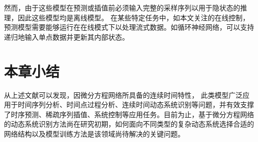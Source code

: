 然而，由于这些模型在预测或插值前必须输入完整的采样序列以用于隐状态的推理，因此这些模型均是离线模型\cite{Liu2020}。
在某些特定任务中，如本文关注的在线控制，预测模型需要能够运行在在线模式下以处理流式数据。如循环神经网络，可以支持递归地输入单点数据并更新其内部状态。


\section{本章小结}
从上述文献可以发现，因微分方程网络所具备的连续时间特性，
此类模型广泛应用于时间序列分析、时间点过程分析、连续时间动态系统识别等问题，并有效支撑了时序预测、稀疏序列插值、系统控制等应用任务。目前为止，基于微分方程网络的动态系统识别方法尚在研究初期，如何面向不同类型的复杂动态系统选择合适的网络结构以及模型训练方法是该领域尚待解决的关键问题。
